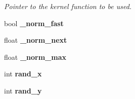 \begin{DoxyCompactItemize}
\begin{DoxyCompactList}\small\item\em Pointer to the kernel function to be used. \item\end{DoxyCompactList}\item 
\hypertarget{classgaussianProcess_a1d522f6812aa8298d51a5187fd6e0902}{
bool {\bfseries \_\-norm\_\-fast}}
\label{classgaussianProcess_a1d522f6812aa8298d51a5187fd6e0902}

\item 
\hypertarget{classgaussianProcess_abc795a8ecb751f135b1e465b8602606a}{
float {\bfseries \_\-norm\_\-next}}
\label{classgaussianProcess_abc795a8ecb751f135b1e465b8602606a}

\item 
\hypertarget{classgaussianProcess_a24f026f323d22eb248c6717976acd707}{
float {\bfseries \_\-norm\_\-max}}
\label{classgaussianProcess_a24f026f323d22eb248c6717976acd707}

\item 
\hypertarget{classgaussianProcess_aa6cd8a1bae973d7dcd3f7e2e0fcac305}{
int {\bfseries rand\_\-x}}
\label{classgaussianProcess_aa6cd8a1bae973d7dcd3f7e2e0fcac305}

\item 
\hypertarget{classgaussianProcess_abb7d5d0787516c64fd1578b9af005928}{
int {\bfseries rand\_\-y}}
\label{classgaussianProcess_abb7d5d0787516c64fd1578b9af005928}

\end{DoxyCompactItemize}
